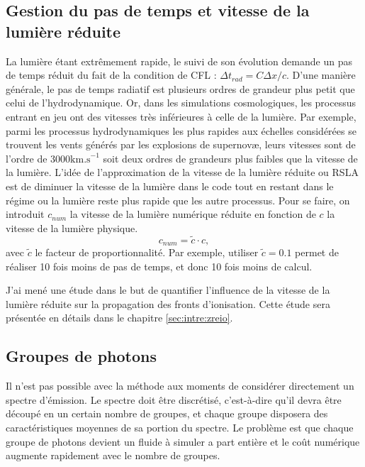 \subsection{Gestion du pas de temps et vitesse de la lumière réduite}
\label{sec:RSLA}

La lumière étant extrêmement rapide, le suivi de son évolution demande un pas de temps réduit du fait de la condition de \ac{CFL} : $\Delta t_{rad} = C  \Delta x /c$.
D'une manière générale, le pas de temps radiatif est plusieurs ordres de grandeur plus petit que celui de l'hydrodynamique.
Or, dans les simulations cosmologiques, les processus entrant en jeu ont des vitesses très inférieures à celle de la lumière.
Par exemple, parmi les processus hydrodynamiques les plus rapides aux échelles considérées se trouvent les vents générés par les explosions de supernovæ, leurs vitesses sont de l'ordre de $3000 \mathrm{km.s}^{-1}$ soit deux ordres de grandeurs plus faibles que la vitesse de la lumière.
L'idée de l'approximation de la vitesse de la lumière réduite ou \ac{RSLA} est de diminuer la vitesse de la lumière dans le code tout en restant dans le régime ou la lumière reste plus rapide que les autre processus.
Pour se faire, on introduit $c_{num}$ la vitesse de la lumière numérique réduite en fonction de $c$ la vitesse de la lumière physique.
\begin{equation}
c_{num} = \tilde{c} \cdot{c},
\end{equation}
avec $\tilde{c}$ le facteur de proportionnalité. 
Par exemple, utiliser $\tilde{c}=0.1$ permet de réaliser 10 fois moins de pas de temps, et donc 10 fois moins de calcul.

J'ai mené une étude dans le but de quantifier l'influence de la vitesse de la lumière réduite sur la propagation des fronts d'ionisation.
Cette étude sera présentée en détails dans le chapitre \ref{sec:intre:zreio}.


\subsection{Groupes de photons}
\label{sec:groupedephotons}

Il n'est pas possible avec la méthode aux moments de considérer directement un spectre d'émission.
Le spectre doit être discrétisé, c'est-à-dire qu'il devra être découpé en un certain nombre de groupes, et chaque groupe disposera des caractéristiques moyennes de sa portion du spectre.
Le problème est que chaque groupe de photons devient un fluide à simuler a part entière et le coût numérique augmente rapidement avec le nombre de groupes. 

